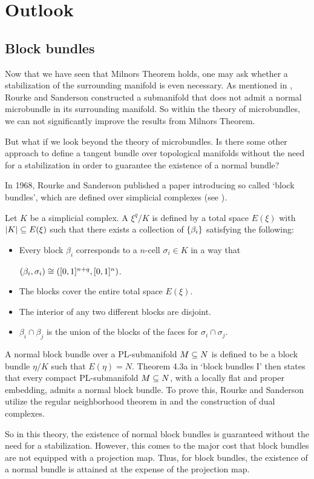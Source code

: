 \section{Outlook}\label{chapter::outlook}
\subsection*{Block bundles}
\begin{myparagraph}
    Now that we have seen that Milnors Theorem holds, one may ask whether a stabilization of the surrounding manifold is even necessary. As mentioned in , Rourke and Sanderson constructed a submanifold that does not admit a normal microbundle in its surrounding manifold. So within the theory of microbundles, we can not significantly improve the results from Milnors Theorem.

    But what if we look beyond the theory of microbundles. Is there some other approach to define a tangent bundle over topological manifolds without the need for a stabilization in order to guarantee the existence of a normal bundle?

    In 1968, Rourke and Sanderson published a paper introducing so called `block bundles', which are defined over simplicial complexes (see \cite{block}).
    
    Let $K$ be a simplicial complex. A  $\xi^q/K$ is defined by a total space $E(\xi)$ with $\vert{} K \vert{} \subseteq{} E(\xi)$ such that there exists a collection of  $\{\beta_i\}$ satisfying the following:
    \begin{itemize}
        \item Every block $\beta_i$ corresponds to a $n$-cell $\sigma_i \in K$ in a way that
        \begin{center}
            $(\beta_i, \sigma_i) \cong ([0, 1]^{n + q}, [0, 1]^n)$.
        \end{center}
        \item The blocks cover the entire total space $E(\xi)$.
        \item The interior of any two different blocks are disjoint.
        \item $\beta_i \cap \beta_j$ is the union of the blocks of the faces for $\sigma_i \cap \sigma_j$.
    \end{itemize}

    A normal block bundle over a PL-submanifold $M \subseteq{} N$ is defined to be a block bundle $\eta/K$ such that $E(\eta) = N$. Theorem 4.3a in `block bundles I' \cite{block} then states that every compact PL-submanifold $M \subseteq{} N$, with a locally flat and proper embedding, admits a normal block bundle. To prove this, Rourke and Sanderson utilize the regular neighborhood theorem in \cite[p.293]{regular} and the construction of dual complexes.

    So in this theory, the existence of normal block bundles is guaranteed without the need for a stabilization. However, this comes to the major cost that block bundles are not equipped with a projection map. Thus, for block bundles, the existence of a normal bundle is attained at the expense of the projection map.
\end{myparagraph}
